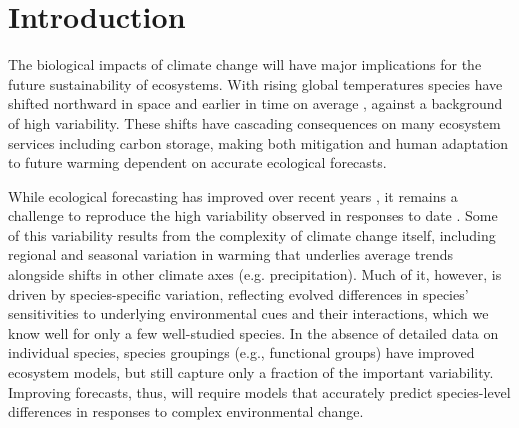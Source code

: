 \documentclass[11pt]{article}
\begin{document}


\section*{Introduction}
The biological impacts of climate change will have major implications for the future sustainability of ecosystems. With rising global temperatures species have shifted northward in space and earlier in time on average \citep{IPCC:2014sm,parmesan2003}, against a background of high variability. These shifts have cascading consequences on many ecosystem services including carbon storage, making both mitigation and human adaptation to future warming dependent on accurate ecological forecasts. 

While ecological forecasting has improved over recent years \citep{dietze2017ecological,lewis2022power}, it remains a challenge to reproduce the high variability observed in responses to date \citep{IPCC:2014sm}. Some of this variability results from the complexity of climate change itself, including regional and seasonal variation in warming that underlies average trends alongside shifts in other climate axes (e.g. precipitation). Much of it, however, is driven by species-specific variation, reflecting evolved differences in species' sensitivities to underlying environmental cues and their interactions, which we know well for only a few well-studied species. In the absence of detailed data on individual species, species groupings (e.g., functional groups) have improved ecosystem models, but still capture only a fraction of the important variability. Improving forecasts, thus, will require models that accurately predict species-level differences in responses to complex environmental change.
\end{document}
